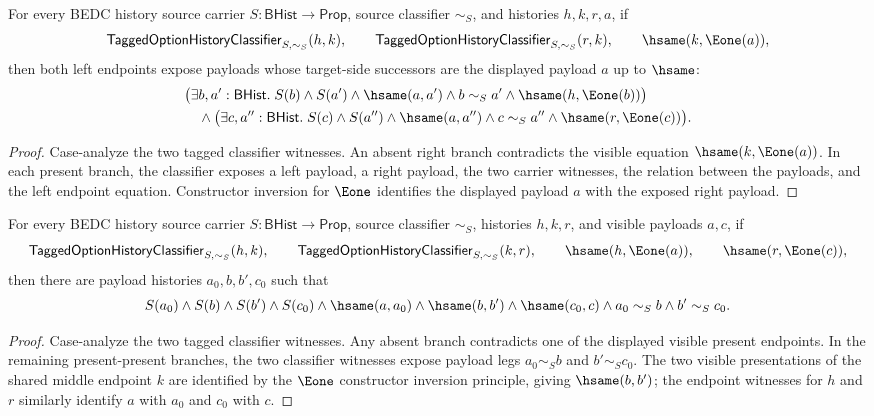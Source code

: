 \begin{theorem}
\label{thm:tagged-option-history-classifier-right-present-payload-fanout}
For every BEDC history source carrier $S:\mathsf{BHist}\to\mathsf{Prop}$,
source classifier $\sim_S$, and histories $h,k,r,a$, if
$$
\mathsf{TaggedOptionHistoryClassifier}_{S,\sim_S}(h,k),\qquad
\mathsf{TaggedOptionHistoryClassifier}_{S,\sim_S}(r,k),\qquad
\hsame(k,\Eone(a)),
$$
then both left endpoints expose payloads whose target-side successors are the
displayed payload $a$ up to $\hsame$:
$$
\begin{aligned}
&\bigl(\exists b,a':\mathsf{BHist}.\;
S(b)\land S(a')\land\hsame(a,a')\land b\sim_S a'
\land\hsame(h,\Eone(b))\bigr)\\
&\quad\land
\bigl(\exists c,a'':\mathsf{BHist}.\;
S(c)\land S(a'')\land\hsame(a,a'')\land c\sim_S a''
\land\hsame(r,\Eone(c))\bigr).
\end{aligned}
$$
\end{theorem}
\begin{proof}
Case-analyze the two tagged classifier witnesses. An absent right branch
contradicts the visible equation $\hsame(k,\Eone(a))$. In each present branch,
the classifier exposes a left payload, a right payload, the two carrier
witnesses, the relation between the payloads, and the left endpoint equation.
Constructor inversion for $\Eone$ identifies the displayed payload $a$ with the
exposed right payload.
\end{proof}

\begin{theorem}
\label{thm:tagged-option-present-chain-payload-witness}
For every BEDC history source carrier $S:\mathsf{BHist}\to\mathsf{Prop}$,
source classifier $\sim_S$, histories $h,k,r$, and visible payloads $a,c$, if
$$
\mathsf{TaggedOptionHistoryClassifier}_{S,\sim_S}(h,k),\qquad
\mathsf{TaggedOptionHistoryClassifier}_{S,\sim_S}(k,r),\qquad
\hsame(h,\Eone(a)),\qquad
\hsame(r,\Eone(c)),
$$
then there are payload histories $a_0,b,b',c_0$ such that
$$
S(a_0)\land S(b)\land S(b')\land S(c_0)\land
\hsame(a,a_0)\land\hsame(b,b')\land\hsame(c_0,c)\land
a_0\sim_S b\land b'\sim_S c_0.
$$
\end{theorem}
\begin{proof}
Case-analyze the two tagged classifier witnesses. Any absent branch
contradicts one of the displayed visible present endpoints. In the remaining
present-present branches, the two classifier witnesses expose payload legs
$a_0\sim_S b$ and $b'\sim_S c_0$. The two visible presentations of the shared
middle endpoint $k$ are identified by the $\Eone$ constructor inversion
principle, giving $\hsame(b,b')$; the endpoint witnesses for $h$ and $r$
similarly identify $a$ with $a_0$ and $c_0$ with $c$.
\end{proof}

